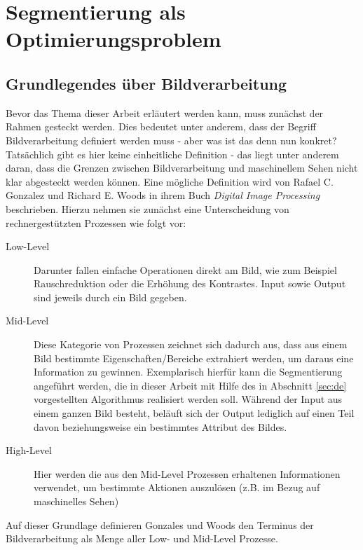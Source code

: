 \chapter{Segmentierung als Optimierungsproblem}
\label{sec:imp}
	
	\section{Grundlegendes über Bildverarbeitung}
	\label{sec:bild-basics}
	
	Bevor das Thema dieser Arbeit erläutert werden kann, muss zunächst der Rahmen gesteckt werden. Dies bedeutet unter anderem, dass der Begriff Bildverarbeitung definiert werden muss - aber was ist das denn nun konkret? Tatsächlich gibt es hier keine einheitliche Definition - das liegt unter anderem daran, dass die Grenzen zwischen Bildverarbeitung und maschinellem Sehen nicht klar abgesteckt werden können. Eine mögliche Definition wird von Rafael C. Gonzalez und Richard E. Woods in ihrem Buch \textit{Digital Image Processing} \cite{gonzalez-woods-imgproc} beschrieben. Hierzu nehmen sie zunächst eine Unterscheidung von rechnergestützten Prozessen wie folgt vor: 
	\begin{description}
		\item[Low-Level] Darunter fallen einfache Operationen direkt am Bild, wie zum Beispiel Rauschreduktion oder die Erhöhung des Kontrastes. Input sowie Output sind jeweils durch ein Bild gegeben.
		\item[Mid-Level] Diese Kategorie von Prozessen zeichnet sich dadurch aus, dass aus einem Bild bestimmte Eigenschaften/Bereiche extrahiert werden, um daraus eine Information zu gewinnen. Exemplarisch hierfür kann die Segmentierung angeführt werden, die in dieser Arbeit mit Hilfe des in Abschnitt \ref{sec:de} vorgestellten Algorithmus realisiert werden soll. Während der Input aus einem ganzen Bild besteht, beläuft sich der Output lediglich auf einen Teil davon beziehungsweise ein bestimmtes Attribut des Bildes.
		\item[High-Level] Hier werden die aus den Mid-Level Prozessen erhaltenen Informationen verwendet, um bestimmte Aktionen auszulösen (z.B. im Bezug auf maschinelles Sehen)
	\end{description}
	
	Auf dieser Grundlage definieren Gonzales und Woods\cite{gonzalez-woods-imgproc} den Terminus der Bildverarbeitung als Menge aller Low- und Mid-Level Prozesse. \\
	
